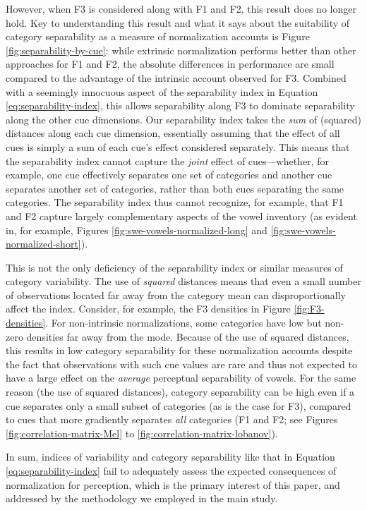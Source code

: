 \documentclass[utf8]{frontiers_suppmat} %
\begin{document}
However, when F3 is considered along with F1 and F2, this result does no longer hold. Key to understanding this result and what it says about the suitability of category separability as a measure of normalization accounts is Figure \ref{fig:separability-by-cue}: while extrinsic normalization performs better than other approaches for F1 and F2, the absolute differences in performance are small compared to the advantage of the intrinsic account observed for F3. Combined with a seemingly innocuous aspect of the separability index in Equation \eqref{eq:separability-index}, this allows separability along F3 to dominate separability along the other cue dimensions. Our separability index takes the \emph{sum} of (squared) distances along each cue dimension, essentially assuming that the effect of all cues is simply a sum of each cue's effect considered separately. This means that the separability index cannot capture the \emph{joint} effect of cues---whether, for example, one cue effectively separates one set of categories and another cue separates another set of categories, rather than both cues separating the same categories. The separability index thus cannot recognize, for example, that F1 and F2 capture largely complementary aspects of the vowel inventory (as evident in, for example, Figures \ref{fig:swe-vowels-normalized-long} and \ref{fig:swe-vowels-normalized-short}).

This is not the only deficiency of the separability index or similar measures of category variability. The use of \emph{squared} distances means that even a small number of observations located far away from the category mean can disproportionally affect the index. Consider, for example, the F3 densities in Figure \ref{fig:F3-densities}. For non-intrinsic normalizations, some categories have low but non-zero densities far away from the mode. Because of the use of squared distances, this results in low category separability for these normalization accounts despite the fact that observations with such cue values are rare and thus not expected to have a large effect on the \emph{average} perceptual separability of vowels. For the same reason (the use of squared distances), category separability can be high even if a cue separates only a small subset of categories (as is the case for F3), compared to cues that more gradiently separates \emph{all} categories (F1 and F2; see Figures \ref{fig:correlation-matrix-Mel} to \ref{fig:correlation-matrix-lobanov}).

In sum, indices of variability and category separability like that in Equation \eqref{eq:separability-index} fail to adequately assess the expected consequences of normalization for perception, which is the primary interest of this paper, and addressed by the methodology we employed in the main study.
\end{document}
